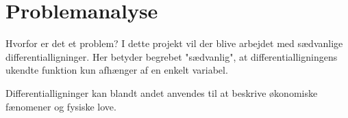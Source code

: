 \section{Problemanalyse}
Hvorfor er det et problem?
I dette projekt vil der blive arbejdet med sædvanlige differentialligninger. Her betyder begrebet "sædvanlig", at differentialligningens ukendte funktion kun afhænger af en enkelt variabel.

Differentialligninger kan blandt andet anvendes til at beskrive økonomiske fænomener og fysiske love. 
